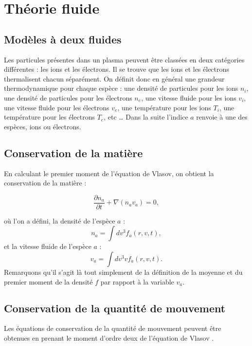 \documentclass{book}
\begin{document}
\section{Th\'eorie fluide}\label{sectiontheoriefluide} 
\subsection{Mod\`eles \`a deux fluides}
Les particules pr\'esentes dans un plasma
peuvent \^etre class\'ees en 
deux cat\'egories  diff\'erentes : les ions et les
\'electrons. 
Il se trouve \cite{Braginskii65} que les ions et les \'electrons
thermalisent chacun s\'epar\'ement. On d\'efinit donc en g\'en\'eral une
grandeur thermodynamique pour chaque esp\`ece : une densit\'e de
particules pour les ions $n_i$, une densit\'e de particules pour les
\'electrons $n_e$, une vitesse fluide pour les ions $v_i$, une  vitesse
fluide pour les \'electrons $v_e$, une temp\'erature pour les ions
$T_i$, une temp\'erature pour les \'electrons $T_e$, etc \dots
Dans la suite l'indice $a$ renvoie \`a une des esp\`eces, ions ou
\'electrons. 

\subsection{Conservation de la mati\`ere}
En calculant le premier moment de l'\'equation  de 
Vlasov, on obtient la
conservation de la mati\`ere  : 

\begin{equation}
\frac{\partial n_a}{\partial t}+\nabla (n_a v_a)=0,
\end{equation}

o\`u l'on a d\'efini, la densit\'e
de l'esp\`ece $a$ : 
\begin{equation}
n_a=\int d v^3 f_a(r,v,t),
\end{equation}
et la vitesse fluide de l'esp\`ece $a$ :
\begin{equation}
v_a=\int d v^3 v f_a(r,v,t).
\end{equation}
Remarquons qu'il s'agit l\`a tout simplement de la d\'efinition de la
moyenne et du premier moment de la densit\'e $f$ par rapport \`a la
variable $v_a$.


\subsection{Conservation de la quantit\'e de
mouvement}\label{sectionconsdeq}   
Les \'equations de conservation 
 de la quantit\'e de mouvement peuvent
\^etre  obtenues en prenant le moment d'ordre deux de 
l'\'equation de
Vlasov \cite{Chen84,Diu89,Braginskii65}. 
\end{document}
